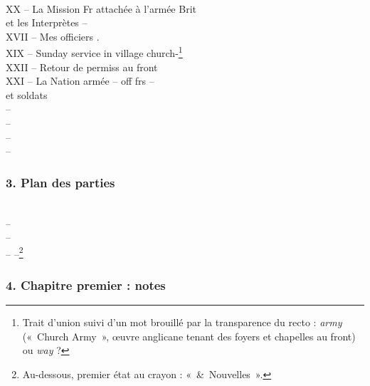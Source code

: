 \begin{LJlettre}
\medskip
{} \\
XX – La Mission Fr attachée à l'armée Brit\\
\hspace*{3em}et les Interprètes –\\
XVII – Mes officiers .\label{annexe:doc6-xvii}\\
XIX – Sunday service in village church-\footnote{Trait d'union suivi d'un mot brouillé par la transparence du recto : \textit{army} («~Church Army~», œuvre anglicane tenant des foyers et chapelles au front) ou \textit{way} ?}\label{annexe:doc6-xix}\\
XXII – Retour de permiss au front\label{annexe:doc6-xxii}\\
XXI – La Nation armée – off frs –\\
\hspace*{3em}et soldats\\
–\\
–\\
–\\
–
\end{LJlettre}

\subsubsection*{3. Plan des parties}\label{annexe:doc6-plan}

\begin{LJlettre}
\noindent{}\\
 –\\
 –\\[2ex]
–  –\footnote{Au-dessous, premier état au crayon : «~\&~Nouvelles~».}
\end{LJlettre}

\subsubsection*{4. Chapitre premier : notes}

